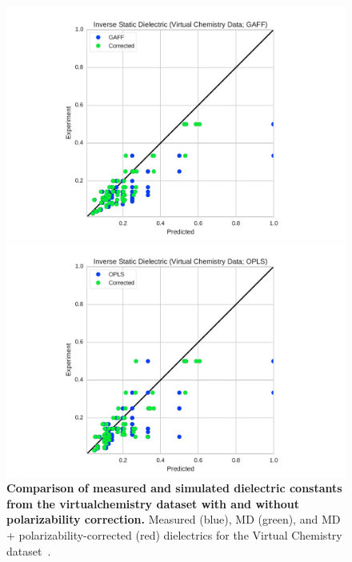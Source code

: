 \documentclass[aps,pre,twocolumn,nofootinbib,superscriptaddress,linenumbers]{revtex4-1}
\begin{document}
\begin{figure}

\includegraphics[width=\columnwidth]{./figures/dielectric_virtual_chemistry_gaff.pdf}

\includegraphics[width=\columnwidth]{./figures/dielectric_virtual_chemistry_opls.pdf}

\caption{{\bf Comparison of measured and simulated dielectric constants from the virtualchemistry dataset with and without polarizability correction.}  Measured (blue), MD (green), and MD + polarizability-corrected (red) dielectrics for the Virtual Chemistry dataset~\cite{caleman2011force, van2012gromacs}.  
}
\label{figure:VirtualChemistry}
\end{figure}


\end{document}
